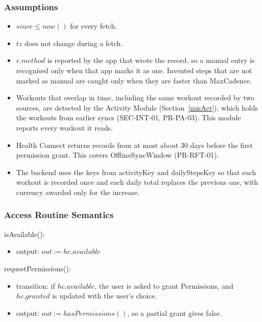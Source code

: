 \documentclass[12pt, titlepage]{article}
\begin{document}
\subsubsection{Assumptions}

\begin{itemize}
\item $\mathit{since} \leq \mathit{now}()$ for every fetch.
\item $\mathit{tz}$ does not change during a fetch.
\item $r.\mathit{method}$ is reported by the app that wrote the record, so a
  manual entry is recognised only when that app marks it as one. Invented
  steps that are not marked as manual are caught only when they are faster
  than \textsf{MaxCadence}.
\item Workouts that overlap in time, including the same workout recorded by
  two sources, are detected by the Activity Module (Section~\ref{misAct}),
  which holds the workouts from earlier syncs (SEC-INT-01, PR-PA-03). This
  module reports every workout it reads.
\item Health Connect returns records from at most about 30 days before the
  first permission grant. This covers \textsf{OfflineSyncWindow} (PR-RFT-01).
\item The backend uses the keys from activityKey and dailyStepsKey so that
  each workout is recorded once and each daily total replaces the previous
  one, with currency awarded only for the increase.
\end{itemize}

\subsubsection{Access Routine Semantics}

\noindent isAvailable():
\begin{itemize}
\item output: $\mathit{out} := \mathit{hc}.\mathit{available}$
\end{itemize}

\noindent requestPermissions():
\begin{itemize}
\item transition: if $\mathit{hc}.\mathit{available}$, the user is asked to
  grant \textsf{Permissions}, and $\mathit{hc}.\mathit{granted}$ is updated
  with the user's choice.
\item output: $\mathit{out} := \mathit{hasPermissions}()$, so a partial
  grant gives false.
\end{itemize}
\end{document}
